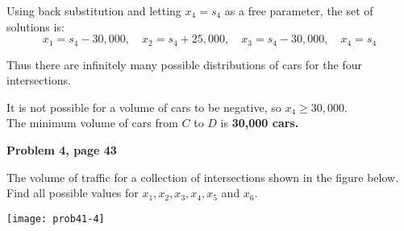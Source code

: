\documentclass[12pt]{article}
\begin{document}
\begin{solution}
Using back substitution and letting $x_4 = s_4$ as a free parameter, the set of solutions is: $$x_1 = s_4 - 30,000, \quad x_2 = s_4 + 25,000, \quad x_3 = s_4 - 30,000, \quad x_4 = s_4$$

Thus there are infinitely many possible distributions of cars for the four intersections.

It is not possible for a volume of cars to be negative, so $x_4 \geq 30,000.$ ~\\

The minimum volume of cars from $C$ to $D$ is \textbf{30,000 cars.}

\end{solution}
\pagebreak

\textbf{Problem 4, page 43}

The volume of traffic for a collection of intersections shown in the figure below. Find all possible values for $x_1, x_2, x_3, x_4, x_5$ and $x_6$. 

\texttt{[image: prob41-4]}
\end{document}
